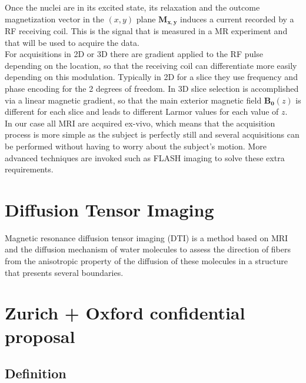 Once the nuclei are in its excited state, its relaxation and the outcome magnetization vector in the $(x, y)$ plane $\mathbf{M_{x, y}}$ induces a current recorded by a RF receiving coil. This is the signal that is measured in a MR experiment and that will be used to acquire the data.\\
For acquisitions in 2D or 3D there are gradient applied to the RF pulse depending on the location, so that the receiving coil can differentiate more easily depending on this modulation. Typically in 2D for a slice they use frequency and phase encoding for the 2 degrees of freedom. In 3D slice selection is accomplished via a linear magnetic gradient, so that the main exterior magnetic field $\mathbf{B_0}(z)$ is different for each slice and leads to different Larmor values for each value of $z$.\\
In our case all MRI are acquired ex-vivo, which means that the acquisition process is more simple as the subject is perfectly still and several acquisitions can be performed without having to worry about the subject's motion. More advanced techniques are invoked such as FLASH imaging to solve these extra requirements.

\section{Diffusion Tensor Imaging}

Magnetic resonance diffusion tensor imaging (DTI) is a method based on MRI and the diffusion mechanism of water molecules to assess the direction of fibers from the anisotropic property of the diffusion of these molecules in a structure that presents several boundaries.

\section{Zurich + Oxford confidential proposal}

\subsection{Definition}

